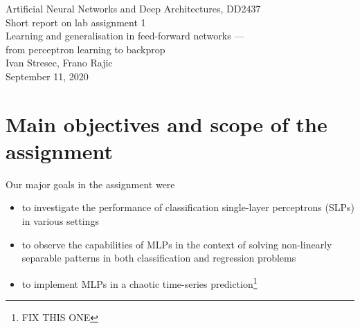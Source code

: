 \documentclass[a4paper]{article}
\begin{document}
\begin{center}
  {\large Artificial Neural Networks and Deep Architectures, DD2437}\\
  \vspace{7mm}
  {\huge Short report on lab assignment 1\\[1ex]}
  {\Large Learning and generalisation in feed-forward networks ---\\[1ex]
 from perceptron learning to backprop}\\
  \vspace{8mm}  
  {\Large Ivan Stresec, Frano Rajic\\}
  \vspace{4mm}
  {\large September 11, 2020\\}
\end{center}


\section{Main objectives and scope of the assignment}

Our major goals in the assignment were  
\begin{itemize}
\item to investigate the performance of classification single-layer perceptrons (SLPs) in various settings
\item to observe the capabilities of MLPs in the context of solving non-linearly separable patterns in both classification and regression problems 
\item to implement MLPs in a chaotic time-series prediction\footnote{FIX THIS ONE}
\end{itemize}
\end{document}
